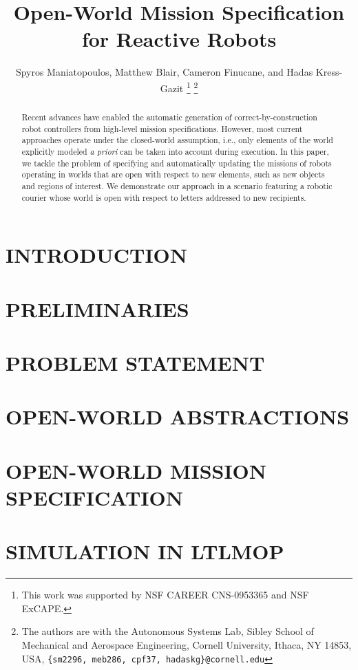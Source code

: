 \documentclass[letterpaper, 10 pt, conference]{ieeeconf}  %
\title{\LARGE \bf
	Open-World Mission Specification for Reactive Robots
}
\author{Spyros Maniatopoulos, Matthew Blair, Cameron Finucane, and Hadas Kress-Gazit%
\thanks{This work was supported by NSF CAREER CNS-0953365 and NSF ExCAPE.}%
\thanks{The authors are with the Autonomous Systems Lab, Sibley School of Mechanical and Aerospace Engineering, Cornell University, Ithaca, NY 14853, USA, {\tt \{sm2296, meb286, cpf37, hadaskg\}\nolinkurl{@cornell.edu}}}%
}
\begin{document}
%
\maketitle
\thispagestyle{empty}
\pagestyle{empty}
%
\begin{abstract}

Recent advances have enabled the automatic generation of correct-by-construction robot controllers from high-level mission specifications. However, most current approaches operate under the closed-world assumption, i.e., only elements of the world explicitly modeled \emph{a priori} can be taken into account during execution. In this paper, we tackle the problem of specifying and automatically updating the missions of robots operating in worlds that are open with respect to new elements, such as new objects and regions of interest. We demonstrate our approach in a scenario featuring a robotic courier whose world is open with respect to letters addressed to new recipients.

\end{abstract}
%
%
\section{INTRODUCTION}

%
\section{PRELIMINARIES}\label{preliminaries}

%
\section{PROBLEM STATEMENT}\label{problem}

%
\section{OPEN-WORLD ABSTRACTIONS}\label{abstractions}

%
\section{OPEN-WORLD MISSION SPECIFICATION}\label{openworld}

%
\section{SIMULATION IN LTLMOP}\label{simulation}  %

%
\end{document}
